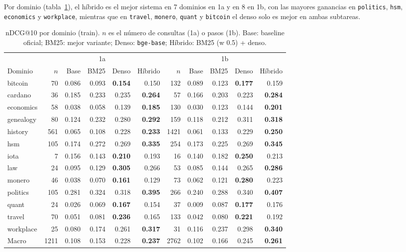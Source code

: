 \documentclass[11pt,a4paper]{article}
\begin{document}
Por dominio (tabla~\ref{tab:dominios}), el híbrido es el mejor sistema en 7 dominios en 1a y en 8 en 1b, con las mayores ganancias en \texttt{politics}, \texttt{hsm}, \texttt{economics} y \texttt{workplace}, mientras que en \texttt{travel}, \texttt{monero}, \texttt{quant} y \texttt{bitcoin} el denso solo es mejor en ambas subtareas.

\begin{table}[t]
\centering
\caption{nDCG@10 por dominio (train). $n$ es el número de consultas (1a) o pasos (1b). Base: baseline oficial; BM25: mejor variante; Denso: \texttt{bge-base}; Híbrido: BM25 (w 0.5) + denso.}
\label{tab:dominios}
\small
\begin{tabular}{lrrrrrrrrrr}
\toprule
 & \multicolumn{5}{c}{1a} & \multicolumn{5}{c}{1b} \\
Dominio & $n$ & Base & BM25 & Denso & Híbrido & $n$ & Base & BM25 & Denso & Híbrido \\
\midrule
bitcoin   & 70  & 0.086 & 0.093 & \textbf{0.154} & 0.150 & 132  & 0.089 & 0.123 & \textbf{0.177} & 0.159 \\
cardano   & 36  & 0.185 & 0.233 & 0.235 & \textbf{0.264} & 57   & 0.166 & 0.203 & 0.223 & \textbf{0.284} \\
economics & 58  & 0.038 & 0.058 & 0.139 & \textbf{0.185} & 130  & 0.030 & 0.123 & 0.144 & \textbf{0.201} \\
genealogy & 80  & 0.124 & 0.232 & 0.280 & \textbf{0.292} & 159  & 0.118 & 0.212 & 0.311 & \textbf{0.318} \\
history   & 561 & 0.065 & 0.108 & 0.228 & \textbf{0.233} & 1421 & 0.061 & 0.133 & 0.229 & \textbf{0.250} \\
hsm       & 105 & 0.174 & 0.272 & 0.269 & \textbf{0.335} & 254  & 0.173 & 0.225 & 0.269 & \textbf{0.345} \\
iota      & 7   & 0.156 & 0.143 & \textbf{0.210} & 0.193 & 16   & 0.140 & 0.182 & \textbf{0.250} & 0.213 \\
law       & 24  & 0.095 & 0.129 & \textbf{0.305} & 0.266 & 53   & 0.085 & 0.144 & 0.265 & \textbf{0.286} \\
monero    & 46  & 0.038 & 0.070 & \textbf{0.161} & 0.129 & 73   & 0.062 & 0.121 & \textbf{0.280} & 0.223 \\
politics  & 105 & 0.281 & 0.324 & 0.318 & \textbf{0.395} & 266  & 0.240 & 0.288 & 0.340 & \textbf{0.407} \\
quant     & 24  & 0.026 & 0.069 & \textbf{0.167} & 0.154 & 37   & 0.009 & 0.087 & \textbf{0.177} & 0.176 \\
travel    & 70  & 0.051 & 0.081 & \textbf{0.236} & 0.165 & 133  & 0.042 & 0.080 & \textbf{0.221} & 0.192 \\
workplace & 25  & 0.080 & 0.174 & 0.261 & \textbf{0.317} & 31   & 0.116 & 0.237 & 0.298 & \textbf{0.340} \\
\midrule
Macro     & 1211 & 0.108 & 0.153 & 0.228 & \textbf{0.237} & 2762 & 0.102 & 0.166 & 0.245 & \textbf{0.261} \\
\bottomrule
\end{tabular}
\end{table}
\end{document}

